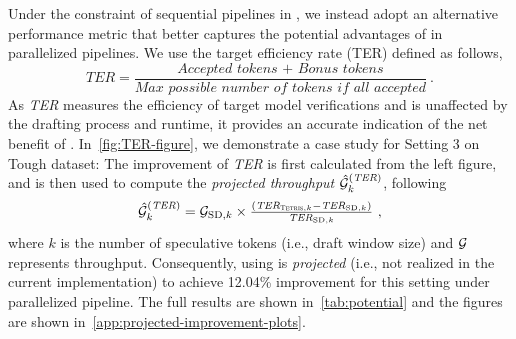 Under the constraint of sequential pipelines in \vllm{}, we instead adopt an alternative performance metric that better captures the potential advantages of \alg{} in parallelized pipelines.
We use the target efficiency rate (TER) defined as follows,
\begin{equation}\label{eq:TER}
  \textstyle  \textit{TER} = \frac{\textit{Accepted tokens + Bonus tokens}}{\textit{Max possible number of tokens if all accepted}} \ .
\end{equation}
As \textit{TER} measures the efficiency of target model verifications and is unaffected by the drafting process and \alg{} runtime, it provides an accurate indication of the net benefit of \alg{}.
In~\cref{fig:TER-figure}, we demonstrate a case study for Setting 3 on Tough dataset: The improvement of \textit{TER} is first calculated from the left figure, and is then used to compute the \textit{projected throughput} $\hat{{\mathcal{G}}}^{(\textit{TER})}_k$, following
\begin{equation*}
     \textstyle \hat{{\mathcal{G}}}^{(\textit{TER})}_k = {\mathcal{G}}_{\text{SD}, k} \times \frac{ (\textit{TER}_{\textsc{Tetris}, k} - \textit{TER}_{\text{SD},k})} {\textit{TER}_{\text{SD},k}} \ ,
\end{equation*}
where $k$ is the number of speculative tokens (i.e., draft window size) and ${\mathcal{G}}$ represents throughput.
Consequently, using \alg{} is \textit{projected} (i.e., not realized in the current implementation) to achieve 12.04\% improvement for this setting under parallelized pipeline.
The full results are shown in~\cref{tab:potential} and the figures are shown in~\cref{app:projected-improvement-plots}.

